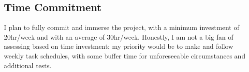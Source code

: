 \subsection{Time Commitment}
    I plan to fully commit and immerse the project, with a minimum investment of 20hr/week and with an average of 30hr/week. Honestly, I am not a big fan of assessing based on time investment; my priority would be to make and follow weekly task schedules, with some buffer time for unforeseeable circumstances and additional tests.
